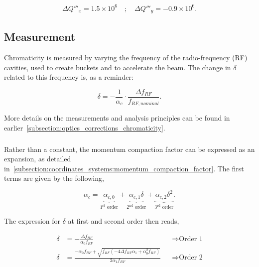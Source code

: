 \begin{equation}
    \begin{aligned}
        \Delta Q'''_x =  1.5 \times 10^6 \quad;\quad
        \Delta Q'''_y = -0.9 \times 10^6.
    \end{aligned}
\end{equation}




\subsection{Measurement}
\label{subsection:decapoles:chromaticity:measurement}

Chromaticity is measured by varying the frequency of the radio-frequency (RF) cavities, used to
create buckets and to accelerate the beam. The change in $\delta$ related to this frequency is, as a
reminder:

\begin{equation}
    \delta = - \frac{1}{\alpha_c} \cdot \frac{\Delta f_{RF}}{f_{RF,nominal}}.
\end{equation}

More details on the measurements and analysis principles can be found in
earlier~\cref{subsection:optics_corrections_chromaticity}.



\subsubsection{}

Rather than a constant, the momentum compaction factor can be expressed as an
expansion, as detailed in~\cref{subsection:coordinates_systems:momentum_compaction_factor}.
The first terms are given by the following,

\begin{equation}
    \alpha_c = 
    \underbrace{\alpha_{c,0}}_{1^\text{st} \text{ order}}
    + \underbrace{\alpha_{c,1} \delta}_{2^\text{nd} \text{ order}}
    + \underbrace{\alpha_{c,2} \delta^2}_{3^\text{rd} \text{ order}}.
\end{equation}

The expression for $\delta$ at first and second order then reads,

\begin{equation}
    \begin{aligned}
        \delta &= -\frac{\Delta f_{RF}}{\alpha_{0} f_{RF}} && \Rightarrow \text{Order 1} \\
        \delta &= \frac{- \alpha_{0} f_{RF} + \sqrt{f_{RF} 
            \left(- 4 \Delta f_{RF} \alpha_{1} + \alpha_{0}^{2} f_{RF}\right)}}{2 \alpha_{1} f_{RF}}
            && \Rightarrow \text{Order 2} 
    \end{aligned}
\end{equation}

